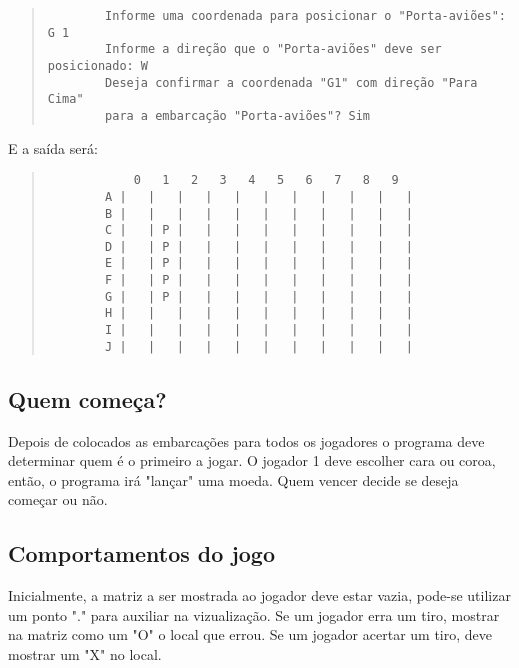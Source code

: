 \documentclass[defesa,oneside]{ppginf}
\begin{document}
\begin{quote}
	\begin{footnotesize}
		\begin{verbatim}
		Informe uma coordenada para posicionar o "Porta-aviões": G 1
		Informe a direção que o "Porta-aviões" deve ser posicionado: W
		Deseja confirmar a coordenada "G1" com direção "Para Cima" 
		para a embarcação "Porta-aviões"? Sim
		\end{verbatim}		
	\end{footnotesize}
\end{quote}

E a saída será:

\begin{quote}
	\begin{footnotesize}
		\begin{verbatim}
		    0   1   2   3   4   5   6   7   8   9
		A |   |   |   |   |   |   |   |   |   |   |
		B |   |   |   |   |   |   |   |   |   |   |
		C |   | P |   |   |   |   |   |   |   |   |
		D |   | P |   |   |   |   |   |   |   |   |
		E |   | P |   |   |   |   |   |   |   |   |
		F |   | P |   |   |   |   |   |   |   |   |
		G |   | P |   |   |   |   |   |   |   |   |
		H |   |   |   |   |   |   |   |   |   |   |
		I |   |   |   |   |   |   |   |   |   |   |
		J |   |   |   |   |   |   |   |   |   |   |
		\end{verbatim}		
	\end{footnotesize}
\end{quote}

\subsection{Quem começa?}

Depois de colocados as embarcações para todos os jogadores o programa deve determinar quem é o primeiro a jogar. O jogador 1 deve escolher cara ou coroa, então, o programa irá "lançar" uma moeda. Quem vencer decide se deseja começar ou não.

\subsection{Comportamentos do jogo}

Inicialmente, a matriz a ser mostrada ao jogador deve estar vazia, pode-se utilizar um ponto "." para auxiliar na vizualização. Se um jogador erra um tiro, mostrar na matriz como um "O" o local que errou. Se um jogador acertar um tiro, deve mostrar um "X" no local. 
\end{document}
